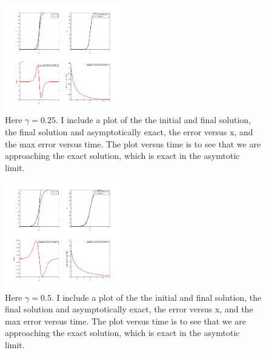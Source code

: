 \documentclass[11pt]{article}
\begin{document}
\begin{enumerate}
\begin{figure}[t!]
  \centering
    \includegraphics[width=0.45\textwidth]{andy_hw14_prb04_g02_01.png}
  \caption{Here $\gamma = 0.25$. I include a plot of the the initial and final solution, the final solution and asymptotically exact, the error versus x, and the max error versus time.
  The plot versus time is to see that we are approaching the exact solution, which is exact in the asymtotic limit.}
\end{figure}

\begin{figure}[t!]
  \centering
    \includegraphics[width=0.45\textwidth]{andy_hw14_prb04_g03_01.png}
  \caption{Here $\gamma = 0.5$. I include a plot of the the initial and final solution, the final solution and asymptotically exact, the error versus x, and the max error versus time.
  The plot versus time is to see that we are approaching the exact solution, which is exact in the asymtotic limit.}
\end{figure}




\end{enumerate}
\end{document}
